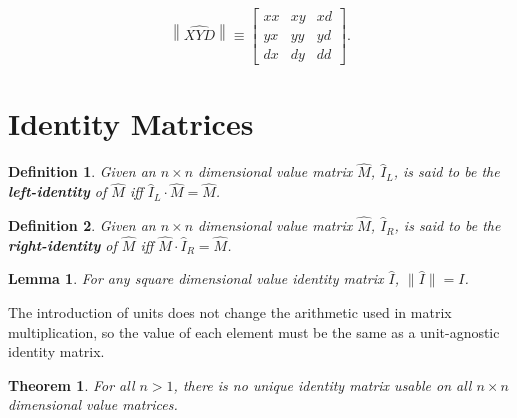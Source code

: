 \documentclass[10pt,letterpaper]{article}
\newtheorem{defn}{Definition}[section]
\newtheorem{lem}{Lemma}[section]
\newtheorem{thm}{Theorem}[section]
\numberwithin{equation}{section}
\begin{document}
 \[ \left\| \widehat{XYD} \right\| \equiv \left[ \begin{matrix} 
  xx & xy & xd \\
  yx & yy & yd \\
  dx & dy & dd
 \end{matrix} \right]. \]
 
\section{Identity Matrices}

\begin{defn}Given an $n \times n$ dimensional value matrix $\hat M$,
  $\hat I_L$, is said to be the \textbf{left-identity} of $\hat M$ iff
  $\hat I_L \cdot \hat M = \hat M$.\end{defn}

\begin{defn}Given an $n \times n$ dimensional value matrix $\hat M$,
  $\hat I_R$, is said to be the \textbf{right-identity} of $\hat M$
  iff $\hat M \cdot \hat I_R = \hat M$.\end{defn}

\begin{lem} \label{dimensional_identities_all_have_the_values_of_I}
  For any square dimensional value identity matrix $\hat I$, $\| \hat
  I \| = I$.\end{lem}

The introduction of units does not change the arithmetic used in
matrix multiplication, so the value of each element must be the same
as a unit-agnostic identity matrix.

\begin{thm}For all $n > 1$, there is no unique identity matrix usable
  on all $n \times n$ dimensional value matrices.\end{thm}
\end{document}
